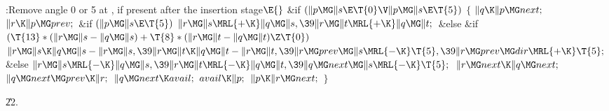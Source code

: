 \Y\B\4:Remove angle 0 or 5 at , if present after the 
insertion stage\X${}\E{}$\6
\&{if} ${}(\|p\MG\|s\E\T{0}\V\|p\MG\|s\E\T{5}){}$\5
${}\{{}$\1\6
${}\|q\K\|p\MG\\{next};{}$\6
${}\|r\K\|p\MG\\{prev};{}$\6
\&{if} ${}(\|p\MG\|s\E\T{5}){}$\1\5
${}\|r\MG\|s\MRL{+{\K}}\|q\MG\|s,\39\|r\MG\|t\MRL{+{\K}}\|q\MG\|t;{}$\2\6
\&{else} \&{if} ${}(\T{13}*(\|r\MG\|s-\|q\MG\|s)+\T{8}*(\|r\MG\|t-\|q\MG\|t)\Z%
\T{0}){}$\1\5
${}\|r\MG\|s\K\|q\MG\|s-\|r\MG\|s,\39\|r\MG\|t\K\|q\MG\|t-\|r\MG\|t,\39\|r\MG%
\\{prev}\MG\|s\MRL{-{\K}}\T{5},\39\|r\MG\\{prev}\MG\\{dir}\MRL{+{\K}}\T{5};{}$%
\2\6
\&{else}\1\5
${}\|r\MG\|s\MRL{-{\K}}\|q\MG\|s,\39\|r\MG\|t\MRL{-{\K}}\|q\MG\|t,\39\|q\MG%
\\{next}\MG\|s\MRL{-{\K}}\T{5};{}$\2\6
${}\|r\MG\\{next}\K\|q\MG\\{next};{}$\6
${}\|q\MG\\{next}\MG\\{prev}\K\|r;{}$\6
${}\|q\MG\\{next}\K\\{avail};{}$\6
${}\\{avail}\K\|p;{}$\6
${}\|p\K\|r\MG\\{next};{}$\6
\4${}\}{}$\2\par
\U22.\fi

